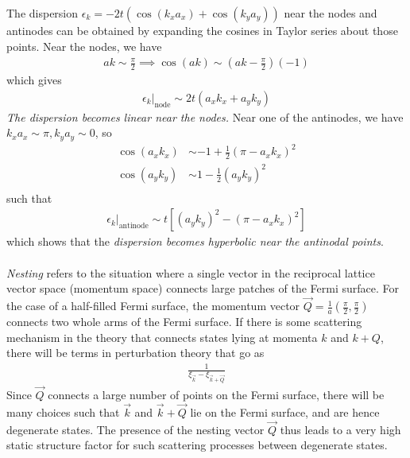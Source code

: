 \documentclass[12pt]{article}
\numberwithin{equation}{section}
\begin{document}
The dispersion \(\epsilon_k = -2t\left(\cos(k_x a_x) + \cos(k_y a_y)\right)\) near the nodes and antinodes can be obtained by expanding the cosines in Taylor series about those points. Near the nodes, we have
\begin{equation}\begin{aligned}
	ak \sim \frac{\pi}{2} \implies \cos(ak) \sim \left(ak - \frac{\pi}{2}\right)(-1)
\end{aligned}\end{equation}
which gives
\begin{equation}\begin{aligned}
	\epsilon_k \vert_\text{node} \sim 2t \left(a_x k_x + a_y k_y\right)
\end{aligned}\end{equation}
\textit{The dispersion becomes linear near the nodes.} Near one of the antinodes, we have \(k_x a_x \sim \pi, k_y a_y \sim 0\), so
\begin{equation}\begin{aligned}
	\cos (a_x k_x) &\sim -1 + \frac{1}{2}\left( \pi - a_x k_x \right)^2\\
	\cos (a_y k_y) &\sim 1 - \frac{1}{2}\left(a_y k_y \right)^2\\
\end{aligned}\end{equation}
such that
\begin{equation}\begin{aligned}
	\epsilon_k \vert_\text{antinode} \sim t \left[\left(a_y k_y \right)^2 - \left( \pi - a_x k_x \right)^2\right]
\end{aligned}\end{equation}
which shows that the \textit{dispersion becomes hyperbolic near the antinodal points}.
\\\\
\textit{Nesting} refers to the situation where a single vector in the reciprocal lattice vector space (momentum space) connects large patches of the Fermi surface. For the case of a half-filled Fermi surface, the momentum vector \(\vec Q = \frac{1}{a}\left( \frac{\pi}{2}, \frac{\pi}{2}\right)\) connects two whole arms of the Fermi surface. If there is some scattering mechanism in the theory that connects states lying at momenta \(k\) and \(k+Q\), there will be terms in perturbation theory that go as
\begin{equation}\begin{aligned}
	\frac{1}{\xi_{\vec k} - \xi_{\vec k + \vec Q}}
\end{aligned}\end{equation}
Since \(\vec Q\) connects a large number of points on the Fermi surface, there will be many choices such that \(\vec k\) and \(\vec k + \vec Q\) lie on the Fermi surface, and are hence degenerate states. The presence of the nesting vector \(\vec Q\) thus leads to a very high static structure factor for such scattering processes between degenerate states.
\end{document}
